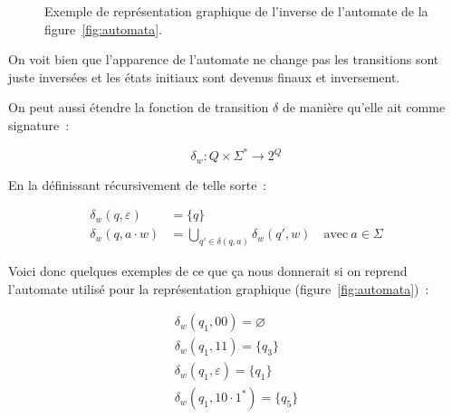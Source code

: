 \begin{figure}[H]
    \centering
    \captionsetup{type=figure,justification=centering}
    \caption{
        Exemple de représentation graphique de l'inverse de l'automate de la
        figure~\ref{fig:automata}.
    }\label{fig:automata_invserse}
\end{figure}

On voit bien que l'apparence de l'automate ne change pas les transitions sont
juste inversées et les états initiaux sont devenus finaux et inversement.

\vphantom{}

On peut aussi étendre la fonction de transition \(\delta\) de manière qu'elle
ait comme signature~:

\[
    \delta_w: Q \times \Sigma^* \to 2^Q
\]

En la définissant récursivement de telle sorte~:

\begin{align}
    \delta_w(q, \varepsilon) & = \{q\}                                                                         \\
    \delta_w(q, a \cdot w)   & = \bigcup_{q' \in \delta(q, a)} \delta_w(q', w) \quad \text{avec}~ a \in \Sigma
\end{align}

\begin{example}
    Voici donc quelques exemples de ce que ça nous donnerait si on reprend
    l'automate utilisé pour la représentation graphique
    (figure~\ref{fig:automata})~:

    \begin{gather}
        \delta_w(q_1, 00) = \varnothing \\
        \delta_w(q_1, 11) = \{q_3\} \\
        \delta_w(q_1, \varepsilon) = \{q_1\} \\
        \delta_w(q_1, 10 \cdot 1^*) = \{q_5\}
    \end{gather}
\end{example}

